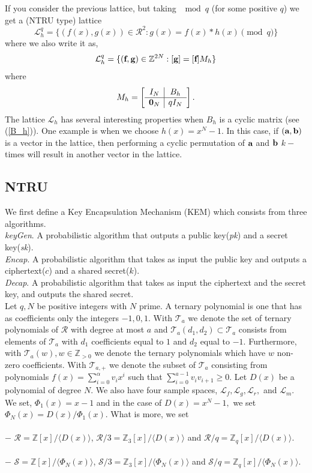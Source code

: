 \documentclass{amsart}
\numberwithin{equation}{section}
\begin{document}
If you consider the previous lattice, but taking ${\mod{q}}$ (for some positive $q$) we get a (NTRU type) lattice
$${\mathcal{L}}_h^q=\{(f(x),g(x))\in {\mathcal{R}}^2 : g(x)=f(x)*h(x)\pmod{q}\}$$ where we also write it as,
$${\mathcal{L}}_h^q=\{({\textbf f},{\textbf g})\in {\mathbb{Z}}^{2N} : [{\textbf g}]=[{\textbf f}]M_h\}$$
where 
$$	M_h=\left[\begin{array}{c|c}
			I_N & B_h  \\
			\hline
			{\textbf 0}_N & qI_N   \\
		\end{array}\right].
			$$
The lattice ${\mathcal{L}}_h$ has several interesting properties when $B_h$ is a cyclic matrix (see (\ref{B_h})). One example is when we choose $h(x)=x^N-1$. In this case, if $({\textbf a},{\textbf b})$ is a vector in the lattice, then performing a cyclic permutation of ${\textbf a}$ and ${\textbf b}$ $k-$times will result in another vector in the lattice.
\subsection{NTRU}
We first define a Key Encapsulation Mechanism (KEM) which consists from three algorithms.\\
{\it{keyGen}}. A probabilistic algorithm that outputs a public key({\it{pk}}) and a secret key({\it{sk}}). \\
{\it{Encap}}. A probabilistic algorithm that takes as input the public key and outputs a ciphertext($c$) and a shared secret($k$). \\
{\it{Decap}}. A probabilistic algorithm that takes as input the ciphertext and the secret key, and outputs the shared secret.\\

Let $q,N$ be positive integers with $N$ prime. A ternary polynomial is one that has as coefficients only the integers $-1,0,1.$  With 
${\mathcal{T}}_a$ we denote the set of ternary polynomials of ${\mathcal{R}}$ with degree at most $a$ and $\mathcal{T}_a(d_1,d_2)\subset {\mathcal{T}}_{a}$ consists from elements of ${\mathcal{T}}_{a}$ with $d_1$ coefficients equal to $1$ and $d_2$ equal to $-1.$ Furthermore, with ${\mathcal{T}}_a(w), w\in{\mathbb{Z}}_{>0}$ we denote the ternary polynomials which have $w$ non-zero coefficients. With ${\mathcal{T}}_{a,+}$ we denote the subset of ${\mathcal{T}}_a$ consisting from polynomials $f(x)=\sum_{i=0}^{\alpha}v_ix^i$ such that $\sum_{i=0}^{a-1}v_iv_{i+1}\ge 0.$	Let $D(x)$ be a polynomial of degree $N.$ We also have four sample spaces,
${\mathcal{L}}_f, {\mathcal{L}}_g, {\mathcal{L}}_r,$ and ${\mathcal{L}}_m.$
We set, $\Phi_1(x)=x-1$ and in the case of $D(x)=x^N-1,$ we set $\Phi_N(x) = D(x)/\Phi_1(x).$  
What is more, we set \\\\
$-$ ${\mathcal{R}}={\mathbb{Z}}[x]/\langle D(x) 
\rangle$, ${\mathcal{R}/3}={\mathbb{Z}}_3[x]/
\langle D(x) \rangle$ and  
${\mathcal{R}}/q={\mathbb{Z}}_q[x]/\langle D(x) 
\rangle$. \\\\
$-$ ${\mathcal{S}}={\mathbb{Z}}[x]/\langle \Phi_N(x) 
\rangle$, ${\mathcal{S}/3}={\mathbb{Z}}_3[x]/\langle \Phi_N(x)  \rangle$ 
and  ${\mathcal{S}}/q={\mathbb{Z}}_q[x]/\langle \Phi_N(x) \rangle.$
\end{document}
